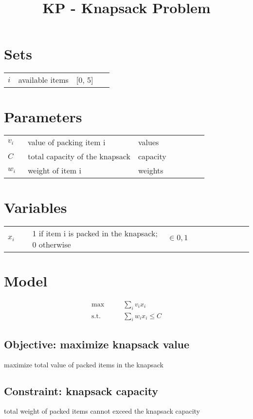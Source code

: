 \documentclass{article}
\title{KP - Knapsack Problem}
\begin{document}
\maketitle

\section{Sets}
\begin{tabular}{ p{0.10\linewidth} p{0.55\linewidth} p{0.35\linewidth} }
 $i$ & available items & [0, 5] \\ 
\end{tabular}


\section{Parameters}
\begin{tabular}{ p{0.10\linewidth} p{0.55\linewidth} p{0.35\linewidth} }
 $v_{i}$ & value of packing item i & values \\ 
 $C$ & total capacity of the knapsack & capacity \\ 
 $w_{i}$ & weight of item i & weights \\ 
\end{tabular}


\section{Variables}
\begin{tabular}{ p{0.10\linewidth} p{0.55\linewidth} p{0.35\linewidth} }
 $x_{i}$ & 1 if item i is packed in the knapsack; 0 otherwise & $ \in { 0, 1 } $ \\ 
\end{tabular}


\section{Model}
\begin{align}
\max \qquad & \sum_{i}v_{i}x_{i} \label{MODELOBJECTIVE}  \\ 
\text{s.t.} \qquad  & \sum_{i}w_{i}x_{i} \leq C \label{MODELCONSTRAINT0} 
\end{align}
\subsection{Objective: maximize knapsack value}


maximize total value of packed items in the knapsack
\subsection{Constraint: knapsack capacity}


total weight of packed items cannot exceed the knapsack capacity
\end{document}
